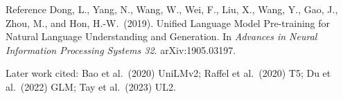 \documentclass[aspectratio=169,11pt]{beamer}
\begin{document}
\begin{frame}{Reference}
  \small
  Dong, L., Yang, N., Wang, W., Wei, F., Liu, X., Wang, Y., Gao, J., Zhou, M., and Hon, H.-W.\ (2019). Unified Language Model Pre-training for Natural Language Understanding and Generation. In \emph{Advances in Neural Information Processing Systems 32}. arXiv:1905.03197.
  \vspace{3mm}

  {\footnotesize Later work cited: Bao et al.\ (2020) UniLMv2; Raffel et al.\ (2020) T5; Du et al.\ (2022) GLM; Tay et al.\ (2023) UL2.}
\end{frame}
\end{document}

